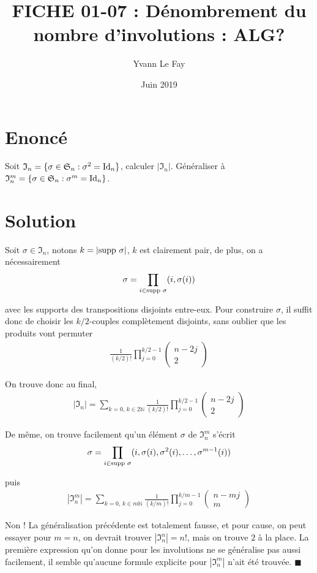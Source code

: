 \documentclass{article}
\newcommand*{\QED}{\hfill\ensuremath{\blacksquare}}%
\begin{document}
\title{FICHE 01-07 : Dénombrement du nombre d'involutions : ALG?}
\author{Yvann Le Fay}
\date{Juin 2019}
\maketitle
\section*{Enoncé}
Soit $\mathfrak{I}_n = \{\sigma\in \mathfrak{S}_n : \sigma^2 = \textup{Id}_n\}$, calculer $|\mathfrak{I}_n|$. Généraliser à $\mathfrak{I}_n^m = \{\sigma \in\mathfrak{S}_n : \sigma^m = \textup{Id}_n\}$.
\section*{Solution}
Soit $\sigma\in\mathfrak{I}_n$, notons $k=|\textup{supp }\sigma|$, $k$ est clairement pair, de plus, on a nécessairement
\begin{align*}
\sigma = \prod_{i \in \textup{supp }\sigma}(i,\sigma(i))
\end{align*}

avec les supports des transpositions disjoints entre-eux. Pour construire $\sigma$, il suffit donc de choisir les $k/2$-couples complètement disjoints, sans oublier que les produits vont permuter
\begin{align*}
\frac{1}{(k/2)!}\prod_{j=0}^{k/2-1}\begin{pmatrix}
n-2j\\2
\end{pmatrix}
\end{align*}

On trouve donc au final,
\begin{align*}
|\mathfrak{I}_n| = \sum_{k=0, \, k \in 2\mathbb{N}}\frac{1}{(k/2)!}\prod_{j=0}^{k/2-1}\begin{pmatrix}n-2j\\2\end{pmatrix}
\end{align*}


De même, on trouve facilement qu'un élément $\sigma$ de $\mathfrak{I}_n^m$ s'écrit
\begin{align*}
\sigma = \prod_{i\in \textup{supp }\sigma}(i,\sigma(i), \sigma^2(i),\ldots,\sigma^{m-1}(i))
\end{align*}

puis
\begin{align*}
|\mathfrak{I}_n^m|= \sum_{k=0,\, k\in m\mathbb{N}}\frac{1}{(k/m)!}\prod_{j=0}^{k/m-1}\begin{pmatrix}n-mj\\m\end{pmatrix}
\end{align*}

Non ! La généralisation précédente est totalement fausse, et pour cause, on peut essayer pour $m = n$, on devrait trouver $|\mathfrak{I}_n^n| = n!$, mais on trouve $2$ à la place. La première expression qu'on donne pour les involutions ne se généralise pas aussi facilement, il semble qu'aucune formule explicite pour $|\mathfrak{I}_n^m|$ n'ait été trouvée. 
\QED
\end{document}

